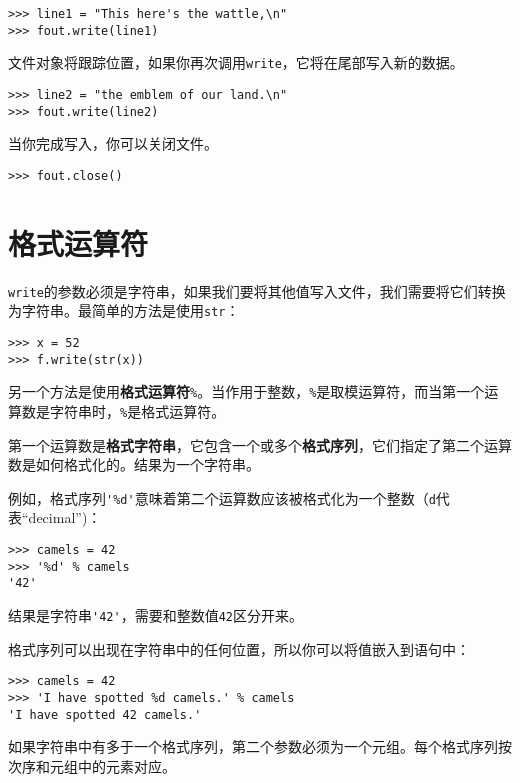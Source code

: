 \beforeverb
\begin{verbatim}
>>> line1 = "This here's the wattle,\n"
>>> fout.write(line1)
\end{verbatim}
\afterverb
%
文件对象将跟踪位置，如果你再次调用{\tt write}，它将在尾部写入新的数据。

\beforeverb
\begin{verbatim}
>>> line2 = "the emblem of our land.\n"
>>> fout.write(line2)
\end{verbatim}
\afterverb
%
当你完成写入，你可以关闭文件。

\beforeverb
\begin{verbatim}
>>> fout.close()
\end{verbatim}
\afterverb
%



\section{格式运算符}


{\tt write}的参数必须是字符串，如果我们要将其他值写入文件，我们需要将它们转换为字符串。最简单的方法是使用{\tt str}：

\beforeverb
\begin{verbatim}
>>> x = 52
>>> f.write(str(x))
\end{verbatim}
\afterverb
%
另一个方法是使用{\bf 格式运算符}{\tt \%}。当作用于整数，{\tt \%}是取模运算符，而当第一个运算数是字符串时，{\tt \%}是格式运算符。


第一个运算数是{\bf 格式字符串}，它包含一个或多个{\bf 格式序列}，它们指定了第二个运算数是如何格式化的。结果为一个字符串。


例如，格式序列\verb"'%d'"意味着第二个运算数应该被格式化为一个整数（{\tt d}代表“decimal”)：

\beforeverb
\begin{verbatim}
>>> camels = 42
>>> '%d' % camels
'42'
\end{verbatim}
\afterverb
%
结果是字符串\verb"'42'"，需要和整数值{\tt 42}区分开来。

格式序列可以出现在字符串中的任何位置，所以你可以将值嵌入到语句中：

\beforeverb
\begin{verbatim}
>>> camels = 42
>>> 'I have spotted %d camels.' % camels
'I have spotted 42 camels.'
\end{verbatim}
\afterverb
%
如果字符串中有多于一个格式序列，第二个参数必须为一个元组。每个格式序列按次序和元组中的元素对应。

